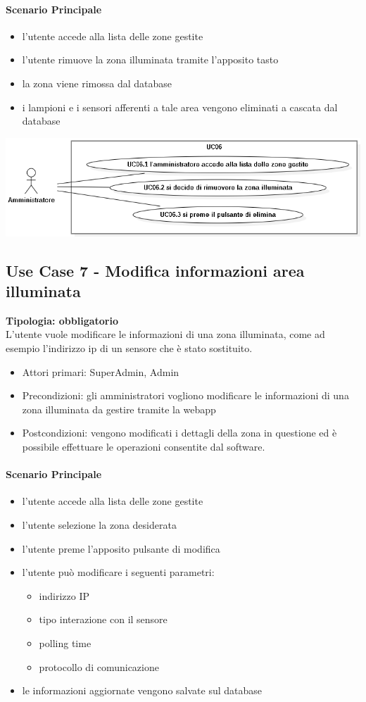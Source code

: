 \documentclass[12pt]{article}
\begin{document}
\paragraph{Scenario Principale}
\begin{itemize}
	\item l'utente accede alla lista delle zone gestite
	\item l'utente rimuove la zona illuminata tramite l'apposito tasto
	\item la zona viene rimossa dal database 
	\item i lampioni e i sensori afferenti a tale area vengono eliminati a cascata dal database
\end{itemize}

\includegraphics[scale=0.5]{UC06.png}

\subsection{Use Case 7 - Modifica informazioni area illuminata}
\textbf{Tipologia: obbligatorio} \\
L'utente vuole modificare le informazioni di una zona illuminata, come ad esempio l'indirizzo ip di un sensore che è stato sostituito.
\begin{itemize}
	\item Attori primari: SuperAdmin, Admin
	\item Precondizioni: gli amministratori vogliono modificare le informazioni di una  zona illuminata da gestire tramite la webapp
	\item Postcondizioni: vengono modificati i dettagli della zona in questione ed è possibile effettuare le operazioni consentite dal software.
\end{itemize}
\paragraph{Scenario Principale}
\begin{itemize}
	\item l'utente accede alla lista delle zone gestite
	\item l'utente selezione la zona desiderata
	\item l'utente preme l'apposito pulsante di modifica
	\item l'utente può modificare i seguenti parametri:
		\begin{itemize}
			\item indirizzo IP
			\item tipo interazione con il sensore
			\item polling time
			\item protocollo di comunicazione
		\end{itemize}
	\item le informazioni aggiornate vengono salvate sul database
\end{itemize}
\end{document}

